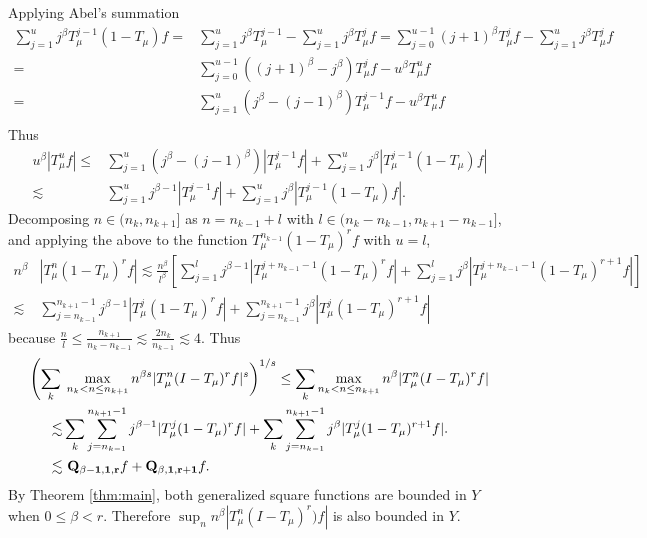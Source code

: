 \documentclass[11pt]{amsart}
\theoremstyle{definition}
\theoremstyle{remark}
\begin{document}
Applying Abel's summation 
\begin{align*}
\sum_{j=1}^u j^{\beta } T_{\mu}^{j-1}(1-T_{\mu})f = & \sum_{j=1}^u j^{\beta } T_{\mu}^{j-1}- \sum_{j=1}^u j^{\beta } T_{\mu}^jf 
=  \sum_{j=0}^{u-1} (j+1)^{\beta } T_{\mu}^{j}f- \sum_{j=1}^u j^{\beta } T_{\mu}^jf\\
= &  \sum_{j=0}^{u-1} ((j+1)^{\beta } - j^{\beta } )T_{\mu}^{j}f- u^{\beta } T_{\mu}^uf\\
= &  \sum_{j=1}^{u} (j^{\beta } - (j-1)^{\beta } )T_{\mu}^{j-1}f- u^{\beta } T_{\mu}^uf\\
\end{align*}
Thus
\begin{align}
u^{\beta }  |T_{\mu}^{u} f| 
\le & \sum_{j=1}^{u} (j^{\beta }-(j-1)^{\beta } )|T_{\mu}^{j-1} f| 
 + \sum_{j=1}^u j^{\beta } |T_{\mu}^{j-1}(1-T_{\mu})f| \nonumber \\
\lesssim & \sum_{j=1}^{u} j^{\beta  -1} |T_{\mu}^{j-1}  f| 
 + \sum_{j=1}^{u} j^{\beta } |T_{\mu}^{j-1}(1-T_{\mu})f|.\label{eqn:abel}
\end{align}
Decomposing $n\in(n_k,n_{k+1}]$ as $n=n_{k-1}+l$ with $l\in (n_k-n_{k-1},n_{k+1}-n_{k-1}]$, and applying the above to the function $T_{\mu}^{n_{k-1}}(1-T_{\mu})^rf$ with $u=l$,
\begin{align*}
n^{\beta } & |T_{\mu}^{n}(1-T_{\mu})^r f| \lesssim \frac{n^{\beta}}{l^{\beta}}\left[
\sum_{j=1}^{l} j^{\beta  -1} |T_{\mu}^{j+n_{k-1}-1} (1-T_{\mu})^r f| 
 + \sum_{j=1}^{l} j^{\beta} |T_{\mu}^{j+n_{k-1}-1}(1-T_{\mu})^{r+1}f| \right] \\
\lesssim & \sum_{j=n_{k-1}}^{n_{k+1}-1} j^{\beta  -1} |T_{\mu}^j (1-T_{\mu})^r f| 
 + \sum_{j=n_{k-1}}^{n_{k+1}-1} j^{\beta} |T_{\mu}^{j} (1-T_{\mu})^{r+1} f |
  \end{align*}
  because $\frac{n}{l} \le \frac{n_{k+1}}{n_k-n_{k-1}}\lesssim \frac{2n_k}{n_{k-1}}\lesssim  4$.
  Thus 
 \begin{align*}
 \left( \sum_k \right. & \left. \max_{n_{k}<n\le n_{k+1}}  n^{\beta s}|T_{\mu}^{n}(I-T_{\mu})^{r} f|^s \right)^{1/s}\le 
 \sum_k  \max_{n_{k}<n\le n_{k+1}}  n^{\beta}|T_{\mu}^{n}(I-T_{\mu})^{r} f| \nonumber \\
 \lesssim & \sum_k \sum_{j=n_{k-1}}^{n_{k+1}-1} j^{\beta  -1} |T_{\mu}^j (1-T_{\mu})^r f| 
 + \sum_k \sum_{j=n_{k-1}}^{n_{k+1}-1} j^{\beta} |T_{\mu}^j (1-T_{\mu})^{r+1} f |. \nonumber \\
\lesssim &  \ {\bf Q_{\beta-1,1,r}}f + {\bf Q_{\beta,1,r+1}}f.  %
\end{align*}
By Theorem \ref{thm:main},
 both generalized square functions are bounded in $Y$ when $0\le \beta< r$. Therefore 
$\sup_n n^{\beta } |T_{\mu}^n(I - T_{\mu})^{r})f|$ is also bounded in $Y$.
\end{document}

